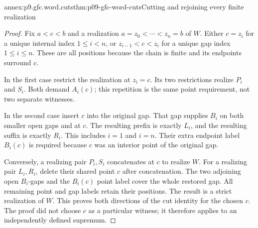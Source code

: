 \begin{annexitem}{annex:p9.gfc.word.cuts}{thm:p09-gfc-word-cuts}{Cutting and rejoining every finite realization}
\begin{proof}
Fix \(a<c<b\) and a realization
\(a=z_0<\cdots<z_n=b\) of \(W\).
Either \(c=z_i\) for a unique
internal index \(1\leq i<n\),
or \(z_{i-1}<c<z_i\) for a
unique gap index \(1\leq i\leq n\).
These are all positions because
the chain is finite and its
endpoints surround \(c\).

In the first case restrict
the realization at \(z_i=c\).
Its two restrictions realize
\(P_i\) and \(S_i\).
Both demand \(A_i(c)\);
this repetition is the
same point requirement,
not two separate witnesses.

In the second case insert
\(c\) into the original
gap. That gap supplies
\(B_i\) on both smaller
open gaps and at \(c\).
The resulting prefix is
exactly \(L_i\), and
the resulting suffix
is exactly \(R_i\).
This includes \(i=1\)
and \(i=n\). Their
extra endpoint label
\(B_i(c)\) is required
because \(c\) was an
interior point of
the original gap.

Conversely, a realizing
pair \(P_i,S_i\)
concatenates at \(c\)
to realize \(W\).
For a realizing pair
\(L_i,R_i\), delete
their shared point
\(c\) after concatenation.
The two adjoining
open \(B_i\)-gaps
and the \(B_i(c)\)
point label cover
the whole restored
gap. All remaining
point and gap
labels retain their
positions. The
result is a strict
realization of \(W\).
This proves both
directions of the
cut identity for
the chosen \(c\).
The proof did not
choose \(c\) as a
particular witness;
it therefore applies
to an independently
defined supremum.
\end{proof}
\end{annexitem}

